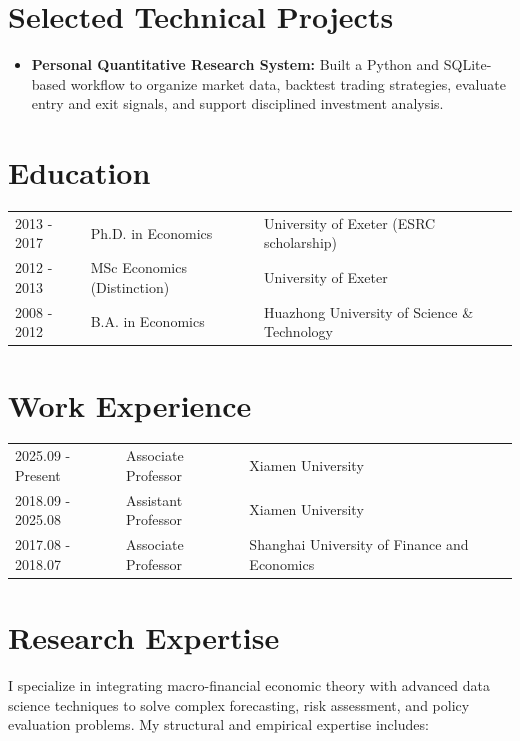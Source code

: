 \documentclass[11pt]{article}
\begin{document}
\section*{Selected Technical Projects}
\begin{itemize}
    \item \textbf{Personal Quantitative Research System:} Built a Python and SQLite-based workflow to organize market data, backtest trading strategies, evaluate entry and exit signals, and support disciplined investment analysis.
\end{itemize}


\section*{Education}

\begin{tabular}{L{2.4cm} L{5cm} L{8cm}}
2013 - 2017 &  Ph.D. in Economics & University of Exeter (ESRC scholarship)\\
2012 - 2013 & MSc Economics (Distinction) & University of Exeter\\
2008 - 2012 & B.A. in Economics &  Huazhong University of Science \& Technology 
\end{tabular}

\section*{Work Experience}

\begin{tabular}{L{3.2cm} L{3.5cm} L{9cm}}
2025.09 - Present & Associate Professor & Xiamen University \\
2018.09 - 2025.08 & Assistant Professor & Xiamen University \\
2017.08 - 2018.07 & Associate Professor & Shanghai University of Finance and Economics \\
\end{tabular}

\section*{Research Expertise}

I specialize in integrating macro-financial economic theory with advanced data science techniques to solve complex forecasting, risk assessment, and policy evaluation problems. My structural and empirical expertise includes:
\end{document}
